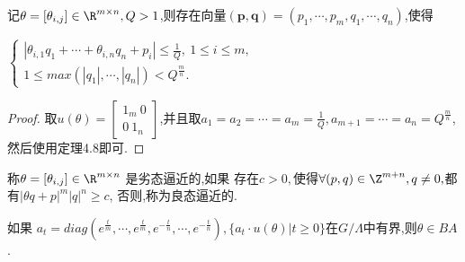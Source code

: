 \begin{theorem}[推广版Dirichlet定理]
    记$\theta = [\theta_{i,j}] \in \R^{m\times n},Q > 1$,则存在向量$(\mathbf{p},\mathbf{q}) = (p_1, \cdots, p_m, q_1, \cdots, q_n)$,使得
    
    $\begin{cases}
        |\theta_{i,1}q_1 + \cdots + \theta_{i,n}q_n + p_i| \leq \frac 1Q, \ 1\leq i \leq m, \\
        1 \leq max(|q_1|,\cdots, |q_n|) < Q^{\frac{m}{n}}. 
    \end{cases}$
\end{theorem}
\begin{proof}
    取$u(\theta) = \begin{bmatrix}
        1_m \ 0 \\
        0 \ 1_n
    \end{bmatrix}$,并且取$a_1 = a_2 = \cdots = a_m = \frac1Q, a_{m+1} = \cdots = a_n = Q^{\frac mn}$,
    然后使用定理4.8即可.
\end{proof}

\begin{definition}
    称$\theta = [\theta_{i,j}] \in \R^{m\times n}$ 是劣态逼近的,如果
    存在$c>0,$使得$\forall (p,q) \in \Z^{m+n}, q\neq 0,$都有$|\theta q+ p|^m |q|^n \geq c$,
    否则,称为良态逼近的.
\end{definition}

\begin{theorem}
    如果 $a_t = diag(e^{\frac tm},\cdots, e^{\frac tm},e^{-\frac tn},\cdots, e^{-\frac tn}),\{a_t \cdot u(\theta) | t \geq 0\}$在$G/\Lambda$中有界,则$\theta \in BA$.
\end{theorem}

